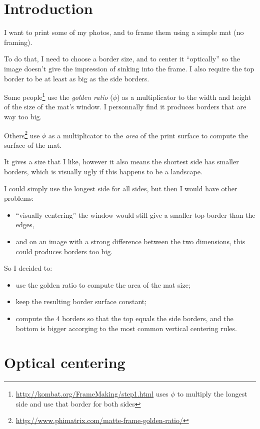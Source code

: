 \documentclass[
    paper=letter,
    parskip=half-,
    DIV=10,
]{scrartcl}
\begin{document}
    \section{Introduction}

    I want to print some of my photos, and to frame them using a simple mat (no framing).

    To do that, I need to choose a border size, and to center it “optically” so the image doesn’t give the impression of sinking into the frame. I also require the top border to be at least as big as the side borders.

    Some people\footnote{\url{http://kombat.org/FrameMaking/step1.html} uses $\phi$ to multiply the longest side and use that border for both sides} use the \emph{golden ratio} ($\phi$) as a multiplicator to the width and height of the size of the mat’s window. I personnally find it produces borders that are way too big.

    Others\footnote{\url{http://www.phimatrix.com/matte-frame-golden-ratio/}} use $\phi$ as a multiplicator to the \emph{area} of the print surface to compute the surface of the mat.

    It gives a size that I like, however it also means the shortest side has smaller borders, which is visually ugly if this happens to be a landscape.

    I could simply use the longest side for all sides, but then I would have other problems:
    \begin{itemize}
        \item “visually centering” the window would still give a smaller top border than the edges,
        \item and on an image with a strong difference between the two dimensions, this could produces borders too big.
    \end{itemize}

    So I decided to:

    \begin{itemize}
        \item use the golden ratio to compute the area of the mat size;
        \item keep the resulting border surface constant;
        \item compute the 4 borders so that the top equals the side borders, and the bottom is bigger accorging to the most common vertical centering rules.
    \end{itemize}

    \section{Optical centering}
\end{document}
